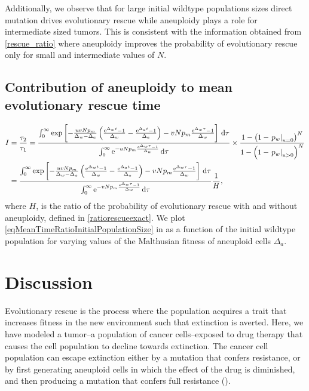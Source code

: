 \documentclass[12pt]{extarticle}
\renewcommand{\d}[1]{\ensuremath{\operatorname{d}\!{#1}}}
\renewcommand{\d}{{\rm d}}
\newcommand{\e}{{\rm e}}
\begin{document}

Additionally, we observe that for large initial wildtype populations sizes direct mutation drives evolutionary rescue while aneuploidy plays a role for intermediate sized tumors. This is consistent with the information obtained from \cref{rescue_ratio} where aneuploidy improves the probability of evolutionary rescue only  for small and intermediate values of $N$.

\subsection*{Contribution of aneuploidy to mean evolutionary rescue time}
\begin{align}
I&=\frac{\tau_2}{\tau_1}=\frac{\int_0^\infty\exp\left[-\frac{uvNp_m}{\Delta_w-\Delta_a}\left(\frac{\e^{\Delta_wt}-1}{\Delta_w}-\frac{\e^{\Delta_at}-1}{\Delta_a}\right)-vNp_m\frac{\e^{\Delta_w\tau}-1}{\Delta_w}\right]\,\d\tau}{\int_0^\infty\e^{-uNp_m\frac{\e^{\Delta_w\tau}-1}{\Delta_w}}\,\d\tau}\times\frac{1-\left(1-\left.p_w\right|_{u=0}\right)^N}{1-\left(1-\left.p_w\right|_{u>0}\right)^N}\\\label{eqMeanTimeRatioInitialPopulationSize}
&=\frac{\int_0^\infty\exp\left[-\frac{uvNp_m}{\Delta_w-\Delta_a}\left(\frac{\e^{\Delta_wt}-1}{\Delta_w}-\frac{\e^{\Delta_at}-1}{\Delta_a}\right)-vNp_m\frac{\e^{\Delta_w\tau}-1}{\Delta_w}\right]\,\d\tau}{\int_0^\infty\e^{-vNp_m\frac{\e^{\Delta_w\tau}-1}{\Delta_w}}\,\d\tau}\frac{1}{H},
\end{align}
where $H$, is the ratio of the probability of evolutionary rescue with and without aneuploidy, defined in \cref{ratiorescueexact}. We plot \cref{eqMeanTimeRatioInitialPopulationSize} in  as a function of the initial wildtype population for varying values of the Malthusian fitness of aneuploid cells $\Delta_a$.

\section*{Discussion}

Evolutionary rescue  is the process where the population acquires a trait that increases fitness in the new environment such that extinction is averted.
Here, we have modeled a tumor--a population of cancer cells--exposed to drug therapy that causes the cell population to decline towards extinction.
The cancer cell population can escape extinction either by a mutation that confers resistance, or by first generating aneuploid cells in which the effect of the drug is diminished, and then producing a mutation that confers full resistance ().
\end{document}
